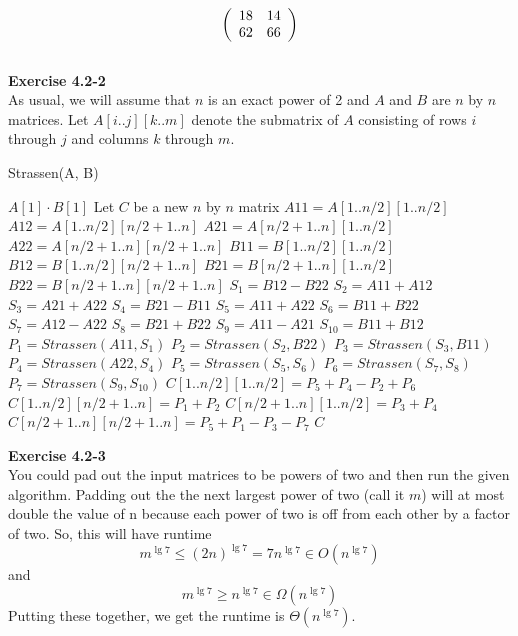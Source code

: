 \documentclass{article}
\begin{document}
\[
\left(\begin{array}{c c}18&14\\62&66\end{array}\right)
\]\\

\noindent\textbf{Exercise 4.2-2}\\

As usual, we will assume that $n$ is an exact power of 2 and $A$ and $B$ are $n$ by $n$ matrices.  Let $A[i..j][k..m]$ denote the submatrix of $A$ consisting of rows $i$ through $j$ and columns $k$ through $m$. \\
\begin{algorithm}
\caption{Strassen(A, B)}
\begin{algorithmic}
	\State \Return $A[1]\cdot B[1]$
\EndIf
\State Let $C$ be a new $n$ by $n$ matrix
\State $A11 = A[1..n/2][1..n/2]$
\State $A12 = A[1..n/2][n/2+1..n]$
\State $A21 = A[n/2+1..n][1..n/2]$
\State $A22 = A[n/2+1..n][n/2+1..n]$
\State $B11 = B[1..n/2][1..n/2]$
\State $B12 = B[1..n/2][n/2+1..n]$
\State $B21 = B[n/2+1..n][1..n/2]$
\State $B22 = B[n/2+1..n][n/2+1..n]$
\State $S_1 = B12-B22$
\State $S_2 = A11+A12$
\State $S_3 = A21 + A22$
\State $S_4 = B21-B11$
\State $S_5 = A11 + A22$
\State $S_6 = B11 + B22$
\State $S_7 = A12 - A22$
\State $S_8 = B21 + B22$
\State $S_9 = A11 - A21$
\State $S_{10} = B11 + B12$
\State $P_1 = Strassen(A11, S_1)$
\State $P_2 = Strassen(S_2, B22)$
\State $P_3 = Strassen(S_3, B11)$
\State $P_4 = Strassen(A22, S_4)$
\State $P_5 = Strassen(S_5, S_6)$
\State $P_6 = Strassen(S_7, S_8)$
\State $P_7 = Strassen(S_9, S_{10})$
\State $C[1..n/2][1..n/2] = P_5 + P_4 - P_2 + P_6$
\State $C[1..n/2][n/2+1..n] = P_1 + P_2$
\State $C[n/2+1..n][1..n/2] = P_3 + P_4$
\State $C[n/2+1..n][n/2+1..n] = P_5 + P_1 - P_3 - P_7$ 
\State \Return $C$
\end{algorithmic}
\end{algorithm}


\noindent\textbf{Exercise 4.2-3}\\

You could pad out the input matrices to be powers of two and then run the given algorithm. Padding out the the next largest power of two (call it $m$) will at most double the value of n because each power of two is off from each other by a factor of two. So, this will have runtime
\[
m^{\lg 7} \le (2n)^{\lg 7} = 7 n^{\lg 7} \in O(n^{\lg 7})
\]
and
\[
m^{\lg 7} \ge n^{\lg 7} \in \Omega(n^{\lg 7})
\]
Putting these together, we get the runtime is $\Theta(n^{\lg 7})$.\\
\end{document}
